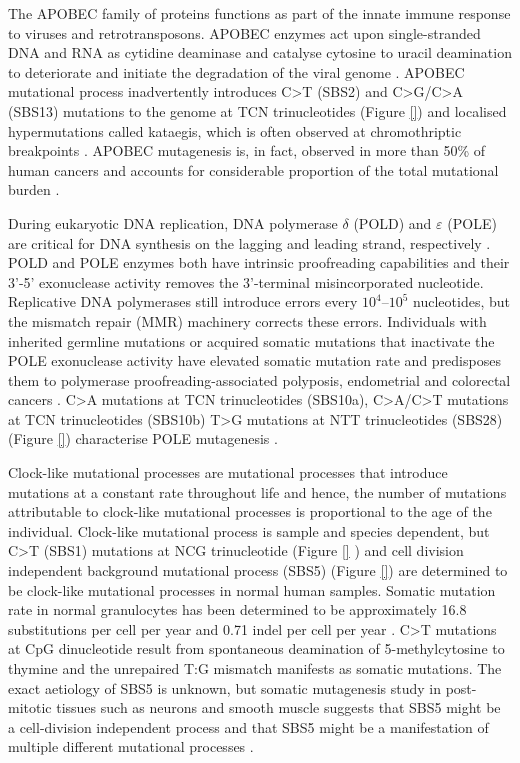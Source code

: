 The APOBEC family of proteins functions as part of the innate immune response to viruses and retrotransposons. APOBEC enzymes act upon single-stranded DNA and RNA as cytidine deaminase and catalyse cytosine to uracil deamination to deteriorate and initiate the degradation of the viral genome \cite{}. APOBEC mutational process inadvertently introduces C>T (SBS2) and C>G/C>A (SBS13) mutations to the genome at TCN trinucleotides (Figure \ref{}) \cite{} and localised hypermutations called kataegis, which is often observed at chromothriptic breakpoints \cite{}. APOBEC mutagenesis is, in fact, observed in more than 50\% of human cancers and accounts for considerable proportion of the total mutational burden \cite{}.

During eukaryotic DNA replication, DNA polymerase $\delta$ (POLD) and $\varepsilon$ (POLE) are critical for DNA synthesis on the lagging and leading strand, respectively \cite{}. POLD and POLE enzymes both have intrinsic proofreading capabilities and their 3’-5’ exonuclease activity removes the 3’-terminal misincorporated nucleotide. Replicative DNA polymerases still introduce errors every $10^4 – 10^5$ nucleotides, but the mismatch repair (MMR) machinery corrects these errors. Individuals with inherited germline mutations or acquired somatic mutations that inactivate the POLE exonuclease activity have elevated somatic mutation rate and predisposes them to polymerase proofreading-associated polyposis, endometrial and colorectal cancers \cite{}. C>A mutations at TCN trinucleotides (SBS10a), C>A/C>T mutations at TCN trinucleotides (SBS10b) T>G mutations at NTT trinucleotides (SBS28) (Figure \ref{}) characterise POLE mutagenesis \cite{}. 

Clock-like mutational processes are mutational processes that introduce mutations at a constant rate throughout life and hence, the number of mutations attributable to clock-like mutational processes is proportional to the age of the individual.  Clock-like mutational process is sample and species dependent, but C>T (SBS1) mutations at NCG trinucleotide (Figure \ref{} ) and cell division independent background mutational process (SBS5) (Figure \ref{}) \cite{} are determined to be clock-like mutational processes in normal human samples. Somatic mutation rate in normal granulocytes has been determined to be approximately 16.8 substitutions per cell per year and 0.71 indel per cell per year \cite{}. C>T mutations at CpG dinucleotide result from spontaneous deamination of 5-methylcytosine to thymine and the unrepaired T:G mismatch manifests as somatic mutations. The exact aetiology of SBS5 is unknown, but somatic mutagenesis study in post-mitotic tissues such as neurons and smooth muscle suggests that SBS5 might be a cell-division independent process and that SBS5 might be a manifestation of multiple different mutational processes \cite{}.



